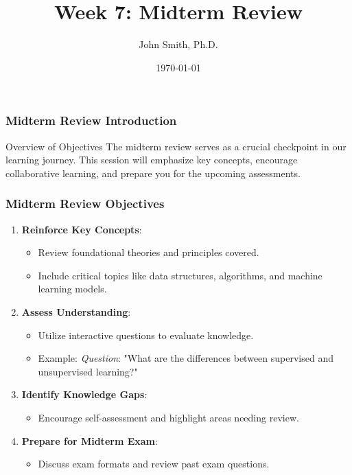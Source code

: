 \documentclass[aspectratio=169]{beamer}
\begin{document}
\frame{\titlepage}

\begin{frame}
  \title{Week 7: Midterm Review}
  \author{John Smith, Ph.D.}
  \date{\today}
  \maketitle
\end{frame}

\begin{frame}[fragile]
  \frametitle{Midterm Review Introduction}
  \begin{block}{Overview of Objectives}
    The midterm review serves as a crucial checkpoint in our learning journey. This session will emphasize key concepts, encourage collaborative learning, and prepare you for the upcoming assessments.
  \end{block}
\end{frame}

\begin{frame}[fragile]
  \frametitle{Midterm Review Objectives}
  \begin{enumerate}
    \item \textbf{Reinforce Key Concepts}: 
      \begin{itemize}
        \item Review foundational theories and principles covered.
        \item Include critical topics like data structures, algorithms, and machine learning models.
      \end{itemize}
      
    \item \textbf{Assess Understanding}:
      \begin{itemize}
        \item Utilize interactive questions to evaluate knowledge.
        \item Example: \textit{Question}: "What are the differences between supervised and unsupervised learning?"
      \end{itemize}
        
    \item \textbf{Identify Knowledge Gaps}:
      \begin{itemize}
        \item Encourage self-assessment and highlight areas needing review.
      \end{itemize}
      
    \item \textbf{Prepare for Midterm Exam}:
      \begin{itemize}
        \item Discuss exam formats and review past exam questions.
      \end{itemize}
  \end{enumerate}
\end{frame}
\end{document}
